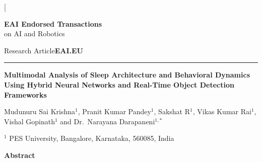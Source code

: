 \documentclass[10pt, a4paper, twocolumn]{article}
\begin{document}

\twocolumn[{%
\thispagestyle{firstpage}%
\noindent
\begin{minipage}[b]{0.60\linewidth}
  {\fontsize{14}{17}\selectfont\textbf{EAI Endorsed Transactions}}\\[1pt]
  {\normalsize on AI and Robotics}
\end{minipage}%
\hfill
\begin{minipage}[b]{0.36\linewidth}
  \raggedleft
  {\normalsize Research Article\quad\textbf{EAI.EU}}
\end{minipage}

\vspace{6pt}
\noindent\rule{\linewidth}{0.8pt}
\vspace{10pt}

{\fontsize{18}{22}\selectfont\bfseries\color{eaiblue}%
Multimodal Analysis of Sleep Architecture and Behavioral Dynamics Using
Hybrid Neural Networks and Real-Time Object Detection Frameworks\par}

\vspace{10pt}

{\normalsize
Mudunuru Sai Krishna$^{1}$,
Pranit Kumar Pandey$^{1}$,
Sakshat R$^{1}$,
Vikas Kumar Rai$^{1}$,
Vishal Gopinath$^{1}$
and Dr.~Narayana Darapaneni$^{1,*}$\par}

\vspace{6pt}

{\small
$^{1}$ PES University, Bangalore, Karnataka, 560085, India\par}

\vspace{12pt}

{\large\bfseries\color{eaiblue} Abstract\par}
\vspace{5pt}

}
\end{document}

